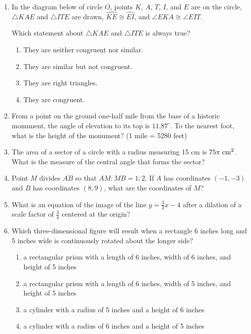 \documentclass[12pt, oneside]{article}
\begin{document}
\begin{enumerate}[itemsep=2cm]
\item In the diagram below of circle $O$, points $K$, $A$, $T$, $I$, and $E$ are on the circle, $\triangle KAE$ and $\triangle ITE$ are drawn, $\wideparen{KE} \cong \wideparen{EI}$, and $\angle EKA \cong \angle EIT$.
\begin{center}
  \end{center}
  Which statement about $\triangle KAE$ and $\triangle ITE$ is always true?
  \begin{enumerate}
    \item They are neither congruent nor similar.
    \item They are similar but not congruent.
    \item They are right triangles.
    \item They are congruent.
  \end{enumerate}

\item From a point on the ground one-half mile from the base of a historic monument, the angle of elevation to its top is $11.87^\circ$. To the nearest foot, what is the height of the monument? (1 mile = 5280 feet)

\item The area of a sector of a circle with a radius measuring 15 cm is $75\pi \; \rm{cm}^2$. What is the measure of the central angle that forms the sector?

\newpage
\item Point $M$ divides $\overline{AB}$ so that $AM:MB = 1:2$. If $A$ has coordinates $(-1,-3)$ and $B$ has coordinates $(8,9)$, what are the coordinates of $M$?


\item What is an equation of the image of the line $\displaystyle y=\frac{3}{2}x-4$ after a dilation of a scale factor of $\displaystyle \frac{3}{4}$ centered at the origin?

\item Which three-dimensional figure will result when a rectangle 6 inches long and 5 inches wide is continuously rotated about the longer side?
\begin{enumerate}
  \item a rectangular prism with a length of 6 inches, width of 6 inches, and height of 5 inches
  \item a rectangular prism with a length of 6 inches, width of 5 inches, and height of 5 inches
  \item a cylinder with a radius of 5 inches and a height of 6 inches
  \item a cylinder with a radius of 6 inches and a height of 5 inches
\end{enumerate}


\end{enumerate}
\end{document}
